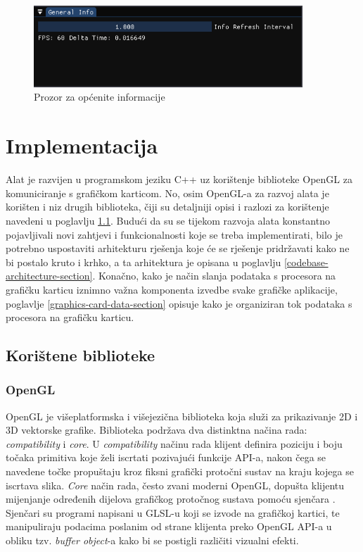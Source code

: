 \documentclass[times, utf8, diplomski]{fer}
\begin{document}
\begin{figure} [H]
	\centering
    \includegraphics[width=0.9\textwidth]{general_info.png}
    \caption{Prozor za općenite informacije}
    \label{fig:general-info}
\end{figure}

\chapter{Implementacija}

Alat je razvijen u programskom jeziku C++ uz korištenje biblioteke OpenGL za komuniciranje s grafičkom karticom. No, osim OpenGL-a za razvoj alata je korišten i niz drugih biblioteka, čiji su detaljniji opisi i razlozi za korištenje navedeni u poglavlju \ref{libraries-section}. Budući da su se tijekom razvoja alata konstantno pojavljivali novi zahtjevi i funkcionalnosti koje se treba implementirati, bilo je potrebno uspostaviti arhitekturu rješenja koje će se rješenje pridržavati kako ne bi postalo kruto i krhko, a ta arhitektura je opisana u poglavlju \ref{codebase-architecture-section}. Konačno, kako je način slanja podataka s procesora na grafičku karticu iznimno važna komponenta izvedbe svake grafičke aplikacije, poglavlje \ref{graphics-card-data-section} opisuje kako je organiziran tok podataka s procesora na grafičku karticu.

\section{Korištene biblioteke} \label{libraries-section}

\subsection{OpenGL}

OpenGL \citep{opengl} je višeplatformska i višejezična biblioteka koja služi za prikazivanje 2D i 3D vektorske grafike. Biblioteka podržava dva distinktna načina rada: \textit{compatibility} i \textit{core}. U \textit{compatibility} načinu rada klijent definira poziciju i boju točaka primitiva koje želi iscrtati pozivajući funkcije API-a, nakon čega se navedene točke propuštaju kroz fiksni grafički protočni sustav na kraju kojega se iscrtava slika. \textit{Core} način rada, često zvani moderni OpenGL, dopušta klijentu mijenjanje određenih dijelova grafičkog protočnog sustava pomoću sjenčara . Sjenčari su programi napisani u GLSL-u  koji se izvode na grafičkoj kartici, te manipuliraju podacima poslanim od strane klijenta preko OpenGL API-a u obliku tzv. \textit{buffer object}-a kako bi se postigli različiti vizualni efekti.\\
\end{document}
